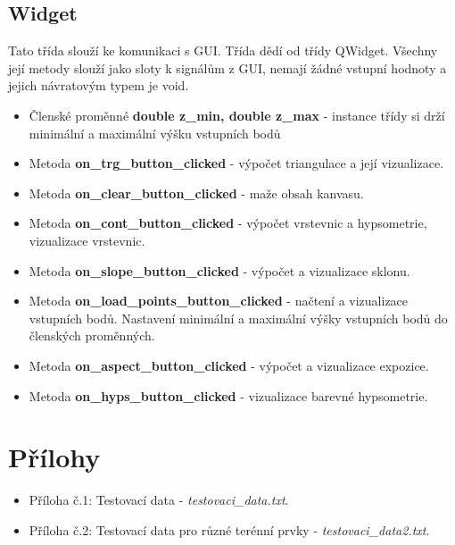 \documentclass[a4paper, 12pt]{article}
\begin{document}
\clearpage


\subsection{Widget}
Tato třída slouží ke komunikaci s GUI. Třída dědí od třídy QWidget. Všechny její metody slouží jako sloty k signálům z GUI, nemají žádné vstupní hodnoty a jejich návratovým typem je void. 

\begin{itemize}
	
	\item Členské proměnné \textbf{double z\_min, double z\_max} - instance třídy si drží minimální a maximální výšku vstupních bodů

	\item Metoda \textbf{on\_trg\_button\_clicked} - výpočet triangulace a její vizualizace.

	\item Metoda \textbf{on\_clear\_button\_clicked} - maže obsah kanvasu.
	
	\item Metoda \textbf{on\_cont\_button\_clicked} - výpočet vrstevnic a hypsometrie, vizualizace vrstevnic.

	\item Metoda \textbf{on\_slope\_button\_clicked} - výpočet a vizualizace sklonu. 

	\item Metoda \textbf{on\_load\_points\_button\_clicked} - načtení a vizualizace vstupních bodů. Nastavení minimální a maximální výšky vstupních bodů do členských proměnných.
	
	\item Metoda \textbf{on\_aspect\_button\_clicked} - výpočet a vizualizace expozice.
	
	\item Metoda \textbf{on\_hyps\_button\_clicked} - vizualizace barevné hypsometrie.

\end{itemize} 


\clearpage

\section{Přílohy}

\begin{itemize}
	\item Příloha č.1: Testovací data - \textit{testovaci\_data.txt}.
	\item Příloha č.2: Testovací data pro různé terénní prvky - \textit{testovaci\_data2.txt}.
\end{itemize}
\clearpage
\end{document}
